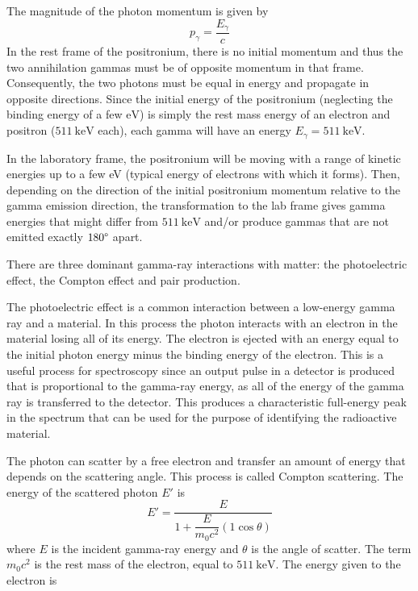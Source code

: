 \documentclass[%
 reprint,
nofootinbib,
 amsmath,amssymb,
 aps,
floatfix,
]{revtex4-2}
\begin{document}
    The magnitude of the photon momentum is given by
    \begin{equation}
        p_{\gamma} = \dfrac{E_{\gamma}}{c}
    \end{equation}
    In the rest frame of the positronium, there is no initial momentum and thus the two annihilation gammas must be of opposite momentum in that frame. Consequently, the two photons must be equal in energy and propagate in opposite directions. Since the initial energy of the positronium (neglecting the binding energy of a few $\si{\electronvolt}$) is simply the rest mass energy of an electron and positron ($\SI{511}{\kilo \electronvolt}$ each), each gamma will have an energy $E_{\gamma} = \SI{511}{\kilo \electronvolt}$.
    \par
    In the laboratory frame, the positronium will be moving with a range of kinetic energies up to a few eV (typical energy of electrons with which it forms). Then, depending on the direction of the initial positronium momentum relative to the gamma emission direction, the transformation to the lab frame gives gamma energies that might differ from $\SI{511}{\kilo \electronvolt}$ and/or produce gammas that are not emitted exactly $180 \degree$ apart.
    \par
    There are three dominant gamma-ray interactions with matter: the photoelectric effect, the Compton effect and pair production.
    \par
    The photoelectric effect is a common interaction between a low-energy gamma ray and a material. In this process the photon interacts with an electron in the material losing all of its energy. The electron is ejected with an energy equal to the initial photon energy minus the binding energy of the electron. This is a useful process for spectroscopy since an output pulse in a detector is produced that is proportional to the gamma-ray energy, as all of the energy of the gamma ray is transferred to the detector. This produces a characteristic full-energy peak in the spectrum that can be used for the purpose of identifying the radioactive material.
    \par
    The photon can scatter by a free electron and transfer an amount of energy that depends on the scattering angle. This process is called Compton scattering. The energy of the scattered photon $E'$ is
    \begin{equation}
        E' = \dfrac{E}{1 + \dfrac{E}{m_0 c^2} (1 \cos \theta)}
    \end{equation}
    where $E$ is the incident gamma-ray energy and $\theta$ is the angle of scatter. The term $m_0 c^2$ is the rest mass of the electron, equal to $\SI{511}{\kilo \electronvolt}$. The energy given to the electron is
\end{document}
